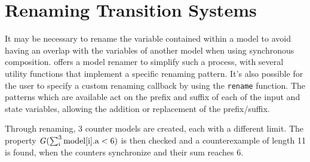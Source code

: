 \section{Renaming Transition Systems}
It may be necessary to rename the variable contained within a model to avoid having an overlap with the variables of another model when using synchronous composition.
\pyvmt{} offers a model renamer to simplify such a process, with several utility functions that implement a specific renaming pattern.
It's also possible for the user to specify a custom renaming callback by using the \texttt{rename} function.
The patterns which are available act on the prefix and suffix of each of the input and state variables, allowing the addition or replacement of the prefix/suffix.


\begin{listing}[H]
    \label{alg:renaming}
    \caption{Through renaming, 3 counter models are created, each with a different limit.
    The property $\G (\sum_\textrm{i}^3 \mathrm{model[i].a} < 6)$ is then checked and a counterexample of length 11 is found, when the counters synchronize and their sum reaches 6.}
\end{listing}

